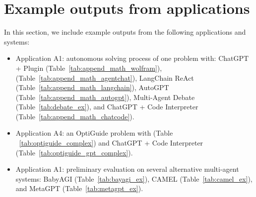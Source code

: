 
\newpage
\section{Example outputs from applications}
\label{sec:example}
In this section, we include example outputs from the following applications and systems:

 \begin{itemize}[leftmargin=*]
    \vspace{-1mm}
    \setlength\itemsep{-0.1em}
    \item Application A1: autonomous solving process of one problem with: ChatGPT + Plugin (Table~\ref{tab:append_math_wolfram}), \libName (Table~\ref{tab:append_math_agentchat}), 
    LangChain ReAct (Table~\ref{tab:append_math_langchain}),   
    AutoGPT (Table~\ref{tab:append_math_autogpt}),
    Multi-Agent Debate (Table~\ref{tab:debate_ex}), and 
    ChatGPT + Code Interpreter (Table~\ref{tab:append_math_chatcode}).
    \item Application A4: an OptiGuide problem with \libName (Table ~\ref{tab:optiguide_complex}) and ChatGPT + Code Interpreter (Table~\ref{tab:optiguide_gpt_complex}).
    \item  Application A1: preliminary evaluation on several alternative multi-agent systems: BabyAGI (Table~\ref{tab:bayagi_ex}), CAMEL (Table~\ref{tab:camel_ex}), and MetaGPT (Table~\ref{tab:metagpt_ex}).
\end{itemize}


